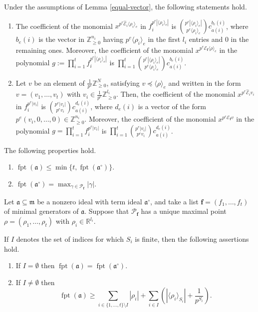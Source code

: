 \documentclass[10pt,a4paper]{amsart}
\newcommand{\Bf}{\boldsymbol{f}}
\newcommand{\E}{\mathcal{E}}
\newcommand{\RR}{\mathbb{R}}
\newcommand{\SP}{\mathcal{P}}
\newcommand{\ZZ}{\mathbb{Z}}
\newcommand{\fa}{\mathfrak{a}}
\newcommand{\fpt}{{\operatorname{fpt}}}
\newcommand{\m}{\mathfrak{m}}
\newcommand{\tE}{\operatorname{\widehat{\E}}}
\begin{document}
\begin{proposition} \label{propoBinomio}
	 Under the assumptions of Lemma \ref{equal-vector}, the following statements hold.
\begin{enumerate}
\item The coefficient of the monomial $x^{p^{e}\tE_i \langle \rho_i \rangle_e}$ in $f_i^{p^{e} |\langle \rho_i \rangle_e|}$ is $\binom{p^{e}|\langle \rho_i \rangle_e|}{p^{e}\langle \rho_i \rangle_e}c_{a(i)}^{b_{e}(i)}$, where $b_{e}(i)$ is the vector in $\ZZ_{\geq 0}^{n_i}$ having $p^{e}\langle \rho_i \rangle_e$ in the first $l_i$ entries and $0$ in the remaining ones. Moreover, the coefficient of the monomial $x^{p^{e}\E_{\Bf} \langle \rho \rangle_e}$ in the polynomial $g:=\prod_{i=1}^{t} f_i^{p^{e}|\langle \rho_i \rangle_e|}$ is $\prod_{i=1}^{t}\binom{p^{e}|\langle \rho_i \rangle_e|}{p^{e}\langle \rho_i \rangle_e}c_{a(i)}^{b_{e}(i)}$.
\item Let $v$ be an element of  $\frac{1}{p^{e}}\ZZ_{\geq 0}^N$, satisfying $v \preceq \langle \rho \rangle_e$ and written in the form $v=(v_1, \ldots, v_t)$ with $v_i \in \frac{1}{p^{e}}\ZZ_{\geq 0}^{l_i}$. Then, the coefficient of the monomial $x^{p^{e}\tE_i v_i}$ in $f_i^{p^{e}|v_i|}$ is $\binom{p^{e}|v_i|}{p^{e} v_i}c_{a(i)}^{d_{e}(i)}$, where $d_{e}(i)$ is a vector of the form $p^e(v_i,0,\ldots,0)\in\ZZ_{\geq 0}^{n_i}$. Moreover, the coefficient of the monomial $x^{p^{e}\E_{\Bf} v}$ in the polynomial $g=\prod_{i=1}^{t} f_i^{p^{e}|v_i|}$ is $\prod_{i=1}^{t}\binom{p^{e}|v_i|}{p^{e}v_i }c_{a(i)}^{d_{e}(i)}$.
\end{enumerate}
\end{proposition}

\begin{proposition}\label{Prop:Properties ftt ideals}The following properties hold.
	\begin{enumerate}
		\item $\fpt(\fa)\leq \min\{t, \fpt(\fa^\circ)\}$.
		\item $\fpt(\fa^\circ)=\max_{\gamma\in \SP_{\Bf} } |\gamma|.$
	\end{enumerate}
\end{proposition}

\begin{theorem} \label{Thm:F-pure-threshold-polytope}
	Let $\fa \subseteq \m$ be a nonzero ideal with term ideal $\fa^\circ$, and take a list $\Bf=(f_1,\ldots,f_t)$  of minimal generators of $\fa$. Suppose that $\SP_{\Bf}$ has a unique maximal point $\rho=(\rho_1, \ldots, \rho_t)$ with $\rho_i \in \RR^{l_i}$.
	
	\noindent If $I$ denotes the set of indices for which $S_i$ is finite, then the following assertions hold.
	\begin{enumerate}
		\item If $I= \emptyset$ then $\fpt(\fa)=\fpt(\fa^\circ)$. 
		\item If $I \ne \emptyset$ then 
		\[
			\fpt(\fa) \geq \sum_{i \in \{1,\ldots,t\} \setminus I}|\rho_i| + \sum_{i \in I}\left(|\langle \rho_i \rangle_{S_i}|+\frac{1}{p^{S_i}}\right).
		\]
	\end{enumerate}
\end{theorem}
\end{document}
